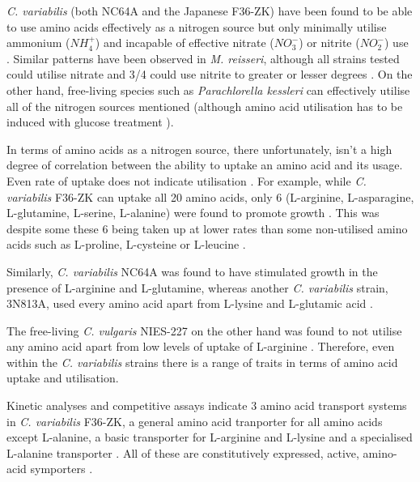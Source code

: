 \textit{C. variabilis} (both NC64A and the Japanese F36-ZK) have been 
found to be able to use amino acids effectively as a nitrogen source but
only minimally utilise ammonium (\(NH_4^{+}\)) and incapable of effective
nitrate (\(NO_3^{-}\)) or nitrite (\(NO_2^{-}\)) use \citep{Kamako2005,Kato2009a}.
Similar patterns have been observed in \textit{M. reisseri}, although
all strains tested could utilise nitrate and 3/4 could use nitrite
to greater or lesser degrees \citep{Kessler1990}.
On the other hand, free-living species such as \textit{Parachlorella
kessleri} can effectively utilise all of the nitrogen sources mentioned \citep{Kato2009a} 
(although amino acid utilisation has to be induced with glucose treatment 
\citep{Cho1981}).


In terms of amino acids as a nitrogen source, there unfortunately, isn't
a high degree of correlation between the ability to uptake an amino acid
and its usage.  Even rate of uptake does not indicate 
utilisation \citep{Kato2009a}.
For example, while \textit{C. variabilis} F36-ZK can
uptake all 20 amino acids, only 6 (L-arginine, L-asparagine,
L-glutamine, L-serine, L-alanine) were found to promote growth \citep{Kato2006}.
This was despite some these 6 being taken up at lower rates
than some non-utilised amino acids such as L-proline, L-cysteine or L-leucine \citep{Kato2006}.

Similarly, \textit{C. variabilis} NC64A was found to have stimulated growth
in the presence of L-arginine and L-glutamine, whereas another \textit{C. variabilis}
strain, 3N813A, used every amino acid apart from L-lysine and L-glutamic acid \citep{McAuley1986,Kato2009a}.

%
The free-living \textit{C. vulgaris} NIES-227 on the other hand was found to not utilise
any amino acid apart from low levels of uptake of L-arginine \citep{Kato2006}.
Therefore, even within the \textit{C. variabilis} strains there is a range 
of traits in terms of amino acid uptake and utilisation.


Kinetic analyses and competitive assays indicate 3 amino acid transport
systems in \textit{C. variabilis} F36-ZK, a general amino acid tranporter
for all amino acids except L-alanine, a basic transporter for L-arginine and L-lysine
and a specialised L-alanine transporter \citep{Kato2009b,Kato2009a}.
All of these are constitutively expressed, active, amino-acid symporters \citep{Kato2009b,Kato2009a}.

